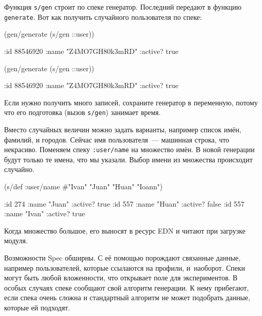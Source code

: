 \fi

\noindent
Функция \verb|s/gen| строит по спеке генератор. Последний передают в функцию
\verb|generate|. Вот как получить случайного пользователя по спеке:

\iflarge

\begin{english}
  \begin{clojure}
(gen/generate (s/gen ::user))
  \end{clojure}
\end{english}

\pagebreak

\begin{english}
  \begin{clojure}
{:id 88546920
 :name "Z4MO7GH80k3mRD"
 :active? true}
  \end{clojure}
\end{english}

\else

\begin{english}
  \begin{clojure}
(gen/generate (s/gen ::user))

{:id 88546920
 :name "Z4MO7GH80k3mRD"
 :active? true}
  \end{clojure}
\end{english}

\fi

Если нужно получить много записей, сохраните генератор в переменную, потому что
его подготовка (вызов \verb|s/gen|) занимает время.

Вместо случайных величин можно задать варианты, например список имён, фамилий, и
городов. Сейчас имя пользователя~--- машинная строка, что некрасиво. Поменяем
спеку \texttt{:user\-/name} на множество имён.  В новой генерации будут только
те имена, что мы указали. Выбор имени из множества происходит случайно.

\begin{english}
  \begin{clojure}
(s/def :user/name
  #{"Ivan" "Juan" "Huan" "Ioann"})

{:id 274 :name "Juan" :active? true}
{:id 557 :name "Huan" :active? false}
{:id 557 :name "Ivan" :active? true}
  \end{clojure}
\end{english}

Когда множество большое, его выносят в ресурс EDN и читают при загрузке модуля.

Возможности Spec обширны. С её помощью порождают связанные данные, например
пользователей, которые ссылаются на профили, и~наоборот. Спеки могут быть любой
вложенности, что открывает поле для экспериментов. В особых случаях спеке
сообщают свой алгоритм генерации. К нему прибегают, если спека очень сложна и
стандартный алгоритм не может подобрать данные, которые ей подходят.

